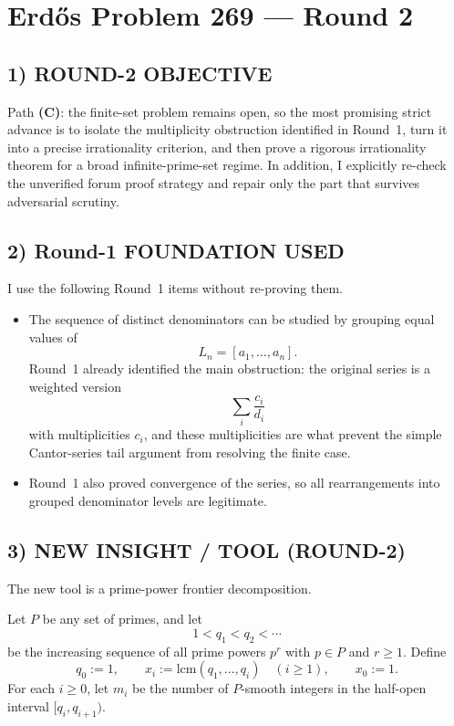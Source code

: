 \section{Erd\H{o}s Problem 269 --- Round 2}

\subsection*{1) ROUND-2 OBJECTIVE}
Path \textbf{(C)}: the finite-set problem remains open, so the most promising strict advance is to isolate the multiplicity obstruction identified in Round~1, turn it into a precise irrationality criterion, and then prove a rigorous irrationality theorem for a broad infinite-prime-set regime. In addition, I explicitly re-check the unverified forum proof strategy and repair only the part that survives adversarial scrutiny.

\subsection*{2) Round-1 FOUNDATION USED}
I use the following Round~1 items without re-proving them.

\begin{itemize}
\item The sequence of distinct denominators can be studied by grouping equal values of
\[
L_n=[a_1,\dots,a_n].
\]
Round~1 already identified the main obstruction: the original series is a weighted version
\[
\sum_i \frac{c_i}{d_i}
\]
with multiplicities $c_i$, and these multiplicities are what prevent the simple Cantor-series tail argument from resolving the finite case.
\item Round~1 also proved convergence of the series, so all rearrangements into grouped denominator levels are legitimate.
\end{itemize}

\subsection*{3) NEW INSIGHT / TOOL (ROUND-2)}
The new tool is a prime-power frontier decomposition.

Let $P$ be any set of primes, and let
\[
1<q_1<q_2<\cdots
\]
be the increasing sequence of all prime powers $p^r$ with $p\in P$ and $r\ge 1$. Define
\[
q_0:=1,
\qquad
x_i:=\mathrm{lcm}(q_1,\dots,q_i)\quad (i\ge 1),
\qquad x_0:=1.
\]
For each $i\ge 0$, let $m_i$ be the number of $P$-smooth integers in the half-open interval $[q_i,q_{i+1})$.


